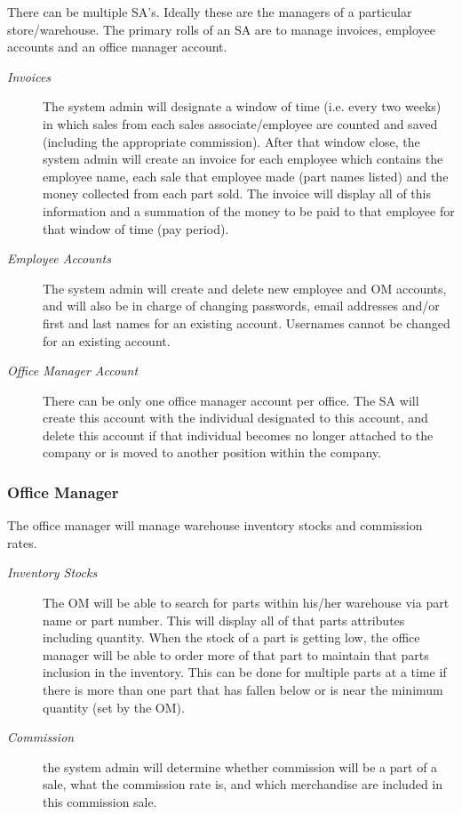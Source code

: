 \documentclass{report}
\begin{document}
There can be multiple SA’s. Ideally these are the managers of a particular store/warehouse. The primary rolls of an SA are to manage invoices, employee accounts and an office manager account.\par
\begin{description}
  \item [\textit{Invoices}] The system admin will designate a window of time (i.e. every two weeks) in which sales from each sales associate/employee are counted and saved (including the appropriate commission). After that window close, the system admin will create an invoice for each employee which contains the employee name, each sale that employee made (part names listed) and the money collected from each part sold. The invoice will display all of this information and a summation of the money to be paid to that employee for that window of time (pay period).
  \item [\textit{Employee Accounts}] The system admin will create and delete new employee and OM accounts, and will also be in charge of changing passwords, email addresses and/or first and last names for an existing account. Usernames cannot be changed for an existing account.\par
  \item [\textit{Office Manager Account}] There can be only one office manager account per office. The SA will create this account with the individual designated to this account, and delete this account if that individual becomes no longer attached to the company or is moved to another position within the company.\par
\end{description}

\subsubsection{Office Manager}

The office manager will manage warehouse inventory stocks and commission rates.\par
\begin{description}
  \item [\textit{Inventory Stocks}] The OM will be able to search for parts within his/her warehouse via part name or part number. This will display all of that parts attributes including quantity. When the stock of a part is getting low, the office manager will be able to order more of that part to maintain that parts inclusion in the inventory. This can be done for multiple parts at a time if there is more than one part that has fallen below or is near the minimum quantity (set by the OM).\par
  \item [\textit{Commission}] the system admin will determine whether commission will be a part of a sale, what the commission rate is, and which merchandise are included in this commission sale.\par
\end{description}
\end{document}
